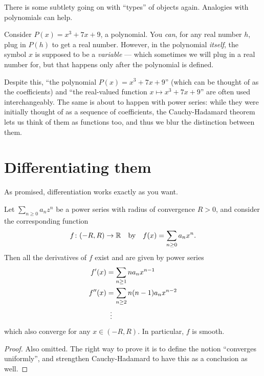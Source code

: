 \begin{abuse}
	There is some subtlety going on with ``types'' of objects again.
	Analogies with polynomials can help.

	Consider $P(x) = x^3 + 7x + 9$, a polynomial.
	You \emph{can}, for any real number $h$,
	plug in $P(h)$ to get a real number.
	However, in the polynomial \emph{itself},
	the symbol $x$ is supposed to be a \emph{variable} ---
	which sometimes we will plug in a real number for,
	but that happens only after the polynomial is defined.

	Despite this, ``the polynomial $P(x) = x^3+7x+9$''
	(which can be thought of as the coefficients)
	and ``the real-valued function $x \mapsto x^3+7x+9$''
	are often used interchangeably.
	The same is about to happen with power series:
	while they were initially thought of as a sequence of
	coefficients, the Cauchy-Hadamard theorem
	lets us think of them as functions too,
	and thus we blur the distinction between them.
%
\end{abuse}

\section{Differentiating them}
As promised, differentiation works exactly as you want.

\begin{theorem}
	Let $\sum_{n \ge 0} a_n z^n$ be a power series with radius of convergence $R > 0$,
	and consider the corresponding function
	\[ f \colon (-R,R) \to \mathbb R \quad\text{by}\quad
		f(x) = \sum_{n \ge 0} a_n x^n. \]
	Then all the derivatives of $f$ exist and are given by power series
	\begin{align*}
		f'(x) &= \sum_{n \ge 1} n a_n x^{n-1} \\
		f''(x) &= \sum_{n \ge 2} n(n-1) a_n x^{n-2} \\
		&\vdotswithin=
	\end{align*}
	which also converge for any $x \in (-R, R)$.
	In particular, $f$ is smooth.
\end{theorem}
\begin{proof}
	Also omitted.
	The right way to prove it is to define the notion ``converges uniformly'',
	and strengthen Cauchy-Hadamard to have this as a conclusion as well.
\end{proof}

